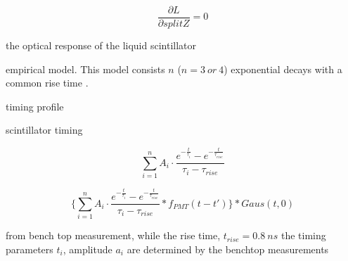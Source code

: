 \[
\frac{\partial L}{\partial splitZ} = 0
\]

the optical response of the liquid scintillator

empirical model. This model consists $n$ ($n=3~or~4$) exponential decays  with a common rise time \cite{biller2020slow}.

timing profile 




scintillator timing

\[\sum^{n}_{i=1}A_i\cdot\frac{e^{-\frac{t}{\tau_i}}-e^{-\frac{t}{\tau_{rise}}}}{\tau_i-\tau_{rise}}
\]


\[
\{\sum^{n}_{i=1}A_i\cdot\frac{e^{-\frac{t}{\tau_i}}-e^{-\frac{t}{\tau_{rise}}}}{\tau_i-\tau_{rise}}*f_{PMT}(t-t')\}*Gaus(t,0)
\]






from bench top measurement, 
while the rise time, $t_{rise} = 0.8~ns$ the timing parameters $t_i$,
amplitude $a_i$ are determined by the benchtop measurements 

